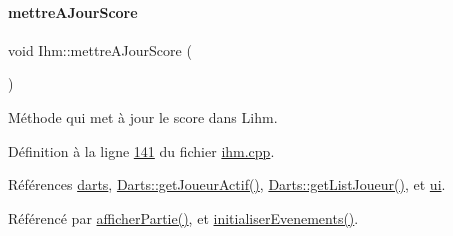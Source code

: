 \paragraph{\texorpdfstring{mettre\+A\+Jour\+Score}{mettreAJourScore}}
{\footnotesize\ttfamily void Ihm\+::mettre\+A\+Jour\+Score (\begin{DoxyParamCaption}{ }\end{DoxyParamCaption})\hspace{0.3cm}{\ttfamily [slot]}}



Méthode qui met à jour le score dans L\textquotesingle{}ihm. 



Définition à la ligne \hyperlink{ihm_8cpp_source_l00141}{141} du fichier \hyperlink{ihm_8cpp_source}{ihm.\+cpp}.



Références \hyperlink{ihm_8h_source_l00055}{darts}, \hyperlink{darts_8cpp_source_l00077}{Darts\+::get\+Joueur\+Actif()}, \hyperlink{darts_8cpp_source_l00055}{Darts\+::get\+List\+Joueur()}, et \hyperlink{ihm_8h_source_l00052}{ui}.



Référencé par \hyperlink{ihm_8cpp_source_l00333}{afficher\+Partie()}, et \hyperlink{ihm_8cpp_source_l00075}{initialiser\+Evenements()}.


